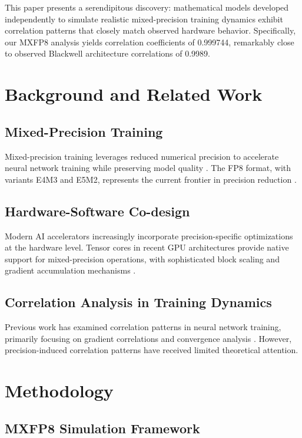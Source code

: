 \documentclass[conference]{IEEEtran}
\begin{document}
This paper presents a serendipitous discovery: mathematical models developed independently to simulate realistic mixed-precision training dynamics exhibit correlation patterns that closely match observed hardware behavior. Specifically, our MXFP8 analysis yields correlation coefficients of 0.999744, remarkably close to observed Blackwell architecture correlations of 0.9989.

\section{Background and Related Work}

\subsection{Mixed-Precision Training}
Mixed-precision training leverages reduced numerical precision to accelerate neural network training while preserving model quality \cite{micikevicius2017mixed}. The FP8 format, with variants E4M3 and E5M2, represents the current frontier in precision reduction \cite{noune2022tensorfloat}.

\subsection{Hardware-Software Co-design}
Modern AI accelerators increasingly incorporate precision-specific optimizations at the hardware level. Tensor cores in recent GPU architectures provide native support for mixed-precision operations, with sophisticated block scaling and gradient accumulation mechanisms \cite{markidis2018nvidia}.

\subsection{Correlation Analysis in Training Dynamics}
Previous work has examined correlation patterns in neural network training, primarily focusing on gradient correlations and convergence analysis \cite{fort2019deep}. However, precision-induced correlation patterns have received limited theoretical attention.

\section{Methodology}

\subsection{MXFP8 Simulation Framework}
\end{document}
